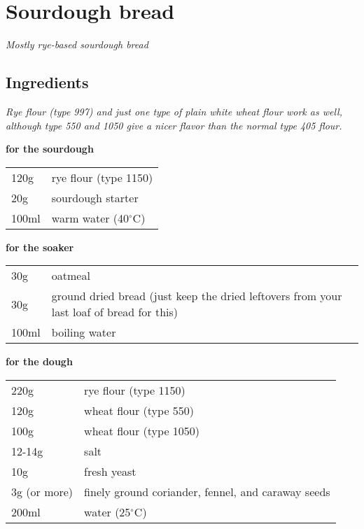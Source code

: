 \section{Sourdough bread}
\textit{Mostly rye-based sourdough bread}

\subsection*{Ingredients}

\textit{Rye flour (type 997) and just one type of plain white wheat flour work as well, although type 550 and 1050 give a nicer flavor than the normal type 405 flour.}

\textbf{for the sourdough}\\
\begin{tabular}{ l l }
  120g & rye flour (type 1150) \\
  20g & sourdough starter \\
  100ml & warm water (40$^\circ$C) \\
\end{tabular}

\textbf{for the soaker}\\
\begin{tabular}{ l l }
  30g & oatmeal \\
  30g & ground dried bread (just keep the dried leftovers from your last loaf of bread for this) \\
  100ml & boiling water\\
\end{tabular}

\textbf{for the dough}\\
\begin{tabular}{ l l }
 220g & rye flour (type 1150) \\
 120g & wheat flour (type 550) \\
 100g & wheat flour (type 1050) \\
 12-14g & salt \\
 10g & fresh yeast \\
 3g (or more) & finely ground coriander, fennel, and caraway seeds \\
 200ml & water (25$^\circ$C) \\
\end{tabular}

